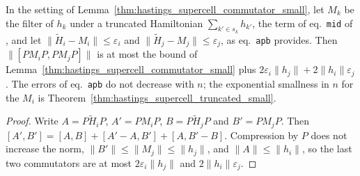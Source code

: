\begin{lemma}
    \label{thm:hastings_supercell_commutator_truncated}
    \leanok
    In the setting of Lemma~\ref{thm:hastings_supercell_commutator_small}, let
    $M_k$ be the filter of $h_k$ under a truncated Hamiltonian
    $\sum_{k'\in s_k}h_{k'}$, the term of eq.~\texttt{mid} of
    \cite[lines 285--307]{Hastings2006Solving}, and let
    $\lVert\tilde H_i-M_i\rVert\le\varepsilon_i$ and
    $\lVert\tilde H_j-M_j\rVert\le\varepsilon_j$, as eq.~\texttt{apb} provides.
    Then $\lVert[PM_iP,PM_jP]\rVert$ is at most the bound of
    Lemma~\ref{thm:hastings_supercell_commutator_small} plus
    $2\varepsilon_i\lVert h_j\rVert+2\lVert h_i\rVert\varepsilon_j$. The errors of
    eq.~\texttt{apb} do not decrease with $n$; the exponential smallness in $n$
    for the $M_i$ is Theorem~\ref{thm:hastings_supercell_truncated_small}.
\end{lemma}
\begin{proof}\leanok
    Write $A=P\tilde H_iP$, $A'=PM_iP$, $B=P\tilde H_jP$ and $B'=PM_jP$. Then
    $[A',B']=[A,B]+[A'-A,B']+[A,B'-B]$. Compression by $P$ does not increase
    the norm, $\lVert B'\rVert\le\lVert M_j\rVert\le\lVert h_j\rVert$, and
    $\lVert A\rVert\le\lVert h_i\rVert$, so the last two commutators are at most
    $2\varepsilon_i\lVert h_j\rVert$ and $2\lVert h_i\rVert\varepsilon_j$.
\end{proof}

